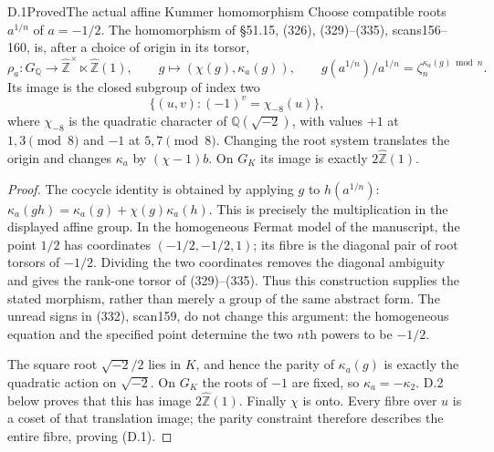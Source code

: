 \begin{statement}{D.1}{Proved}{The actual affine Kummer homomorphism}
Choose compatible roots $a^{1/n}$ of $a=-1/2$. The homomorphism of \S51.15, (326), (329)--(335), scans156--160, is, after a choice of origin in its torsor,
\[
 \rho_a:G_{\mathbb Q}\longrightarrow
 \widehat{\mathbb Z}^{\times}\ltimes\widehat{\mathbb Z}(1),
 \qquad g\longmapsto(\chi(g),\kappa_a(g)),\qquad
 g(a^{1/n})/a^{1/n}=\zeta_n^{\kappa_a(g)\bmod n}.
\]
Its image is the closed subgroup of index two
\[
 \{(u,v):(-1)^v=\chi_{-8}(u)\},                         \tag{D.1}
\]
where $\chi_{-8}$ is the quadratic character of $\mathbb Q(\sqrt{-2})$, with values $+1$ at $1,3\pmod8$ and $-1$ at $5,7\pmod8$. Changing the root system translates the origin and changes $\kappa_a$ by $(\chi-1)b$. On $G_K$ its image is exactly $2\widehat{\mathbb Z}(1)$.
\end{statement}
\begin{proof}
The cocycle identity is obtained by applying $g$ to $h(a^{1/n})$:
$\kappa_a(gh)=\kappa_a(g)+\chi(g)\kappa_a(h)$. This is precisely the multiplication in the displayed affine group. In the homogeneous Fermat model of the manuscript, the point $1/2$ has coordinates $(-1/2,-1/2,1)$; its fibre is the diagonal pair of root torsors of $-1/2$. Dividing the two coordinates removes the diagonal ambiguity and gives the rank-one torsor of (329)--(335). Thus this construction supplies the stated morphism, rather than merely a group of the same abstract form. The unread signs in (332), scan159, do not change this argument: the homogeneous equation and the specified point determine the two $n$th powers to be $-1/2$.

The square root $\sqrt{-2}/2$ lies in $K$, and hence the parity of $\kappa_a(g)$ is exactly the quadratic action on $\sqrt{-2}$. On $G_K$ the roots of $-1$ are fixed, so $\kappa_a=-\kappa_2$. D.2 below proves that this has image $2\widehat{\mathbb Z}(1)$. Finally $\chi$ is onto. Every fibre over $u$ is a coset of that translation image; the parity constraint therefore describes the entire fibre, proving (D.1).
\end{proof}

